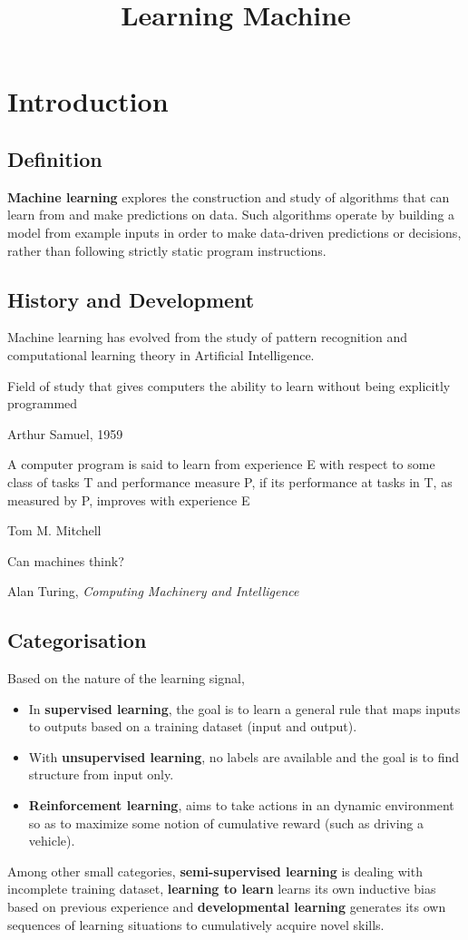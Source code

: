 \documentclass[twocolumn]{article}
\title{Learning Machine}
\date{\vspace{-6ex}}
\numberwithin{equation}{section}
\begin{document}
\maketitle



\section{Introduction}

	\subsection{Definition}
\begin{framed}
\textbf{Machine learning} explores the construction and study of algorithms that can learn from and make predictions on data. Such algorithms operate by building a model from example inputs in order to make data-driven predictions or decisions, rather than following strictly static program instructions.
\end{framed}

	\subsection{History and Development}
Machine learning has evolved from the study of pattern recognition and computational learning theory in Artificial Intelligence.

\epigraph{Field of study that gives computers the ability to learn without being explicitly programmed}{Arthur Samuel, 1959}

\epigraph{A computer program is said to learn from experience E with respect to some class of tasks T and performance measure P, if its performance at tasks in T, as measured by P, improves with experience E}{Tom M. Mitchell}

\epigraph{Can machines think?}{Alan Turing, \textit{Computing Machinery and Intelligence}}

	\subsection{Categorisation}
Based on the nature of the learning signal,
\begin{itemize}
	\item In \textbf{supervised learning}, the goal is to learn a general rule that maps inputs to outputs based on a training dataset (input and output). 
	\item With \textbf{unsupervised learning}, no labels are available and the goal is to find structure from input only.
	\item \textbf{Reinforcement learning}, aims to take actions in an dynamic environment so as to maximize some notion of cumulative reward (such as driving a vehicle).
\end{itemize}
 Among other small categories, \textbf{semi-supervised learning} is dealing with incomplete training dataset, \textbf{learning to learn} learns its own inductive bias based on previous experience and \textbf{developmental learning} generates its own sequences of learning situations to cumulatively acquire novel skills.
 
\end{document}
